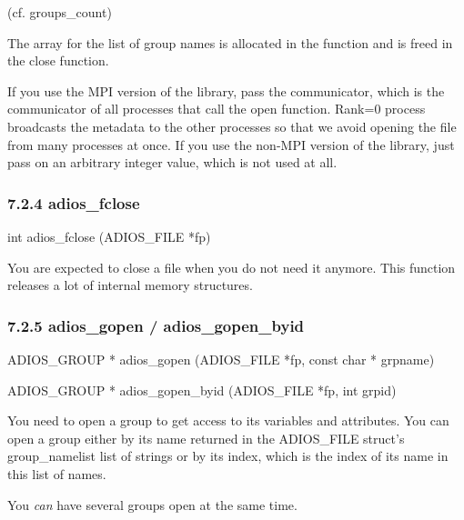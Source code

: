 \vspace{10pt}
\parindent=39pt
(cf. groups\_count)

\vspace{10pt}
\leftskip=0pt
\parindent=0pt
The array for the list of group names is allocated in the function and is freed 
in the close function.

\vspace{10pt}
If you use the MPI version of the library, pass the communicator, which is the 
communicator of all processes that call the open function. Rank=0 process broadcasts 
the metadata to the other processes so that we avoid opening the file from many 
processes at once.  If you use the non-MPI version of the library, just pass on 
an arbitrary integer value, which is not used at all. \label{HToc182553402}

\vspace{10pt}
\subsubsection*{{\large \textbf{7.2.4 adios\_fclose}}}

\vspace{10pt}
int adios\_fclose (ADIOS\_FILE *fp)

\vspace{10pt}
You are expected to close a file when you do not need it anymore. This function 
releases a lot of internal memory structures.\label{HToc182553403}

\vspace{10pt}
\subsubsection*{{\large \textbf{7.2.5 adios\_gopen / adios\_gopen\_byid}}}

\vspace{10pt}
ADIOS\_GROUP * adios\_gopen (ADIOS\_FILE *fp, const char * grpname)

\vspace{10pt}
ADIOS\_GROUP * adios\_gopen\_byid (ADIOS\_FILE *fp, int grpid)

\vspace{22pt}
You need to open a group to get access to its variables and attributes. You can 
open a group either by its name returned in the ADIOS\_FILE struct's group\_namelist 
list of strings or by its index, which is the index of its name in this list of 
names. 

\vspace{10pt}
You \textit{can} have several groups open at the same time.

